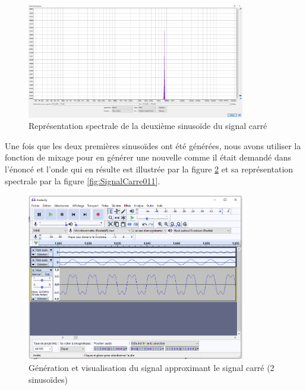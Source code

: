 \documentclass[a4paper]{article}
\begin{document}
\begin{figure}[H]
    \centering
    \includegraphics[width=0.85\textwidth]{images/SignalCarre022.PNG}
    \caption{Représentation spectrale de la deuxième sinusoïde du signal carré}
    \label{fig:SignalCarre022}
\end{figure}


Une fois que les deux premières sinusoïdes ont été générées, nous avons utiliser la fonction de mixage pour en générer une nouvelle comme il était demandé dans l'énoncé et l'onde qui en résulte est illustrée par la figure \ref{fig:SignalCarre010} et sa représentation spectrale par la figure \ref{fig:SignalCarre011}.


\begin{figure}[H]
    \centering
    \includegraphics[width=0.85\textwidth]{images/SignalCarre010.PNG}
    \caption{Génération et visualisation du signal approximant le signal carré (2 sinusoïdes)}
    \label{fig:SignalCarre010}
\end{figure}
\end{document}
